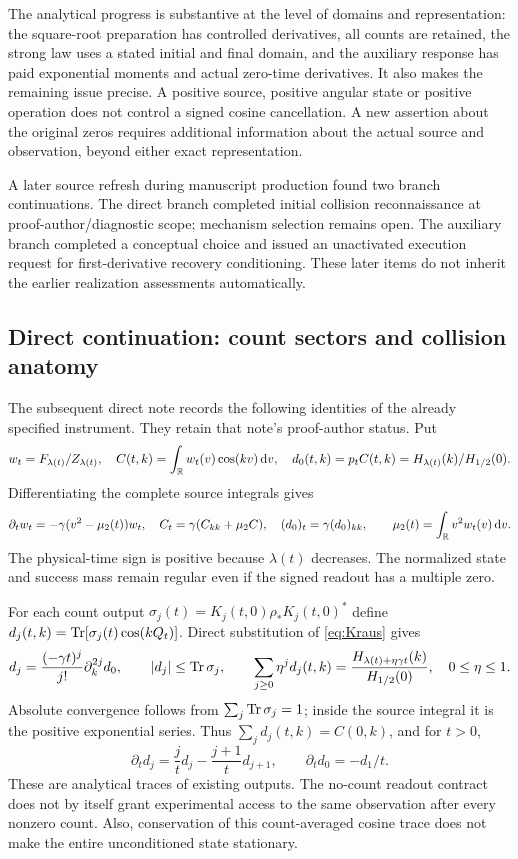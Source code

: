 The analytical progress is substantive at the level of domains and
representation: the square-root preparation has controlled derivatives,
all counts are retained, the strong law uses a stated initial and final
domain, and the auxiliary response has paid exponential moments and
actual zero-time derivatives. It also makes the remaining issue precise.
A positive source, positive angular state or positive operation does not
control a signed cosine cancellation. A new assertion about the original
zeros requires additional information about the actual source and
observation, beyond either exact representation.

A later source refresh during manuscript production found two branch
continuations. The direct branch completed initial collision reconnaissance
at proof-author/diagnostic scope; mechanism selection remains open. The
auxiliary branch completed a conceptual choice and issued an unactivated
execution request for first-derivative recovery conditioning. These later
items do not inherit the earlier realization assessments automatically.

\subsection{Direct continuation: count sectors and collision anatomy}
The subsequent direct note \cite{TNDDirectCollision} records the following
identities of the already specified instrument. They retain that note's
proof-author status. Put
\[
 w_t=F_{\lambda(t)}/Z_{\lambda(t)},\quad
 C(t,k)=\int_\mathbb R w_t(v)\cos(kv)\,\mathrm d v,\quad
 d_0(t,k)=p_tC(t,k)=H_{\lambda(t)}(k)/H_{1/2}(0).
\]
Differentiating the complete source integrals gives
\begin{equation}\label{eq:diagnosticPDE}
 \partial_tw_t=-\gamma(v^2-\mu_2(t))w_t,\quad
 C_t=\gamma(C_{kk}+\mu_2C),\quad
 (d_0)_t=\gamma(d_0)_{kk},\qquad
 \mu_2(t)=\int_\mathbb R v^2w_t(v)\,\mathrm d v.
\end{equation}
The physical-time sign is positive because $\lambda(t)$ decreases.
The normalized state and success mass remain regular even if the
signed readout has a multiple zero.

For each count output $\sigma_j(t)=K_j(t,0)\rho_*K_j(t,0)^*$ define
$d_j(t,k)=\operatorname{Tr}[\sigma_j(t)\cos(kQ_t)]$. Direct substitution of
\eqref{eq:Kraus} gives
\begin{equation}\label{eq:countjets}
 d_j=\frac{(-\gamma t)^j}{j!}\partial_k^{2j}d_0,\qquad
 |d_j|\le\operatorname{Tr}\sigma_j,\qquad
 \sum_{j\ge0}\eta^jd_j(t,k)
 =\frac{H_{\lambda(t)+\eta\gamma t}(k)}{H_{1/2}(0)},\quad0\le\eta\le1.
\end{equation}
Absolute convergence follows from $\sum_j\operatorname{Tr}\sigma_j=1$; inside the
source integral it is the positive exponential series. Thus
$\sum_jd_j(t,k)=C(0,k)$, and for $t>0$,
\begin{equation}\label{eq:counttransfer}
 \partial_td_j=\frac jt d_j-\frac{j+1}{t}d_{j+1},\qquad
 \partial_td_0=-d_1/t.
\end{equation}
These are analytical traces of existing outputs. The no-count readout
contract does not by itself grant experimental access to the same
observation after every nonzero count. Also, conservation of this
count-averaged cosine trace does not make the entire unconditioned
state stationary.

